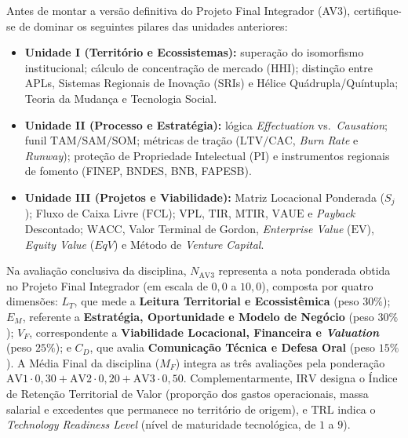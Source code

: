 \begin{capRevisao}
Antes de montar a versão definitiva do Projeto Final Integrador (AV3), certifique-se de dominar os seguintes pilares das unidades anteriores:
\begin{itemize}[leftmargin=1.4em, itemsep=2pt]
  \item \textbf{Unidade I (Território e Ecossistemas):} superação do isomorfismo institucional; cálculo de concentração de mercado ($\text{HHI}$); distinção entre APLs, Sistemas Regionais de Inovação (SRIs) e Hélice Quádrupla/Quíntupla; Teoria da Mudança e Tecnologia Social.
  \item \textbf{Unidade II (Processo e Estratégia):} lógica \textit{Effectuation} vs.\ \textit{Causation}; funil $\text{TAM/SAM/SOM}$; métricas de tração ($\text{LTV/CAC}$, \textit{Burn Rate} e \textit{Runway}); proteção de Propriedade Intelectual (PI) e instrumentos regionais de fomento (FINEP, BNDES, BNB, FAPESB).
  \item \textbf{Unidade III (Projetos e Viabilidade):} Matriz Locacional Ponderada ($S_j$); Fluxo de Caixa Livre ($\text{FCL}$); $\text{VPL}$, $\text{TIR}$, $\text{MTIR}$, $\text{VAUE}$ e \textit{Payback} Descontado; $\text{WACC}$, Valor Terminal de Gordon, \textit{Enterprise Value} ($\text{EV}$), \textit{Equity Value} ($EqV$) e Método de \textit{Venture Capital}.
\end{itemize}
\end{capRevisao}


\begin{boxSimbolo}
Na avaliação conclusiva da disciplina, $N_{\text{AV3}}$ representa a nota ponderada obtida no Projeto Final Integrador (em escala de $0{,}0$ a $10{,}0$), composta por quatro dimensões: $L_T$, que mede a \textbf{Leitura Territorial e Ecossistêmica} (peso $30\%$); $E_M$, referente a \textbf{Estratégia, Oportunidade e Modelo de Negócio} (peso $30\%$); $V_F$, correspondente a \textbf{Viabilidade Locacional, Financeira e \textit{Valuation}} (peso $25\%$); e $C_D$, que avalia \textbf{Comunicação Técnica e Defesa Oral} (peso $15\%$). A Média Final da disciplina ($M_F$) integra as três avaliações pela ponderação $\text{AV1} \cdot 0{,}30 + \text{AV2} \cdot 0{,}20 + \text{AV3} \cdot 0{,}50$. Complementarmente, $\text{IRV}$ designa o Índice de Retenção Territorial de Valor (proporção dos gastos operacionais, massa salarial e excedentes que permanece no território de origem), e $\text{TRL}$ indica o \textit{Technology Readiness Level} (nível de maturidade tecnológica, de $1$ a $9$).
\end{boxSimbolo}


